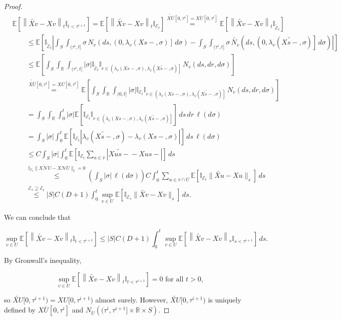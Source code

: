 \documentclass[12pt]{article}
\newcommand{\mb}{\mathbb}
\newcommand{\mc}{\mathcal}
\newcommand{\ov}{\overline}
\newcommand{\os}{\overset}
\newcommand{\te}{\text}
\newcommand{\ind}{\hspace{24pt}}
\newcommand{\ex}[1]{\mb{E}\left[#1\right]}			%
\renewcommand{\v}{v}							%
\newcommand{\vv}{u}								%
\renewcommand{\U}{U}							%
\renewcommand{\S}{S}							%
\newcommand{\s}{\sigma}							%
\renewcommand{\t}{t}							%
\renewcommand{\tt}{s}							%
\newcommand{\X}{X}								%
\newcommand{\neigh}{\mc{N}}						%
\newcommand{\cl}{\ov}							%
\newcommand{\const}{C}							%
\newcommand{\degr}{D}							%
\newcommand{\poiss}[1]{N_{#1}}						%
\renewcommand{\r}{r}								%
\newcommand{\rt}[1]{\tau^{#1}}						%
\newcommand{\itt}{i}								%
\newcommand{\rate}[1]{\lambda_{#1}}					%
\newcommand{\Sm}{\ell}								%
\newcommand{\alt}{\widetilde}						%
\newcommand{\evnt}{\mc{E}}						%
\begin{document}
\begin{proof}
\begin{align*}
&\ex{\left\|\alt{\X{\v}{}} - \X{\v}{}\right\|_{\t}\mb{I}_{\t < \rt{\itt+1}}} = \ex{\left\|\alt{\X{\v}{}} - \X{\v}{}\right\|_{\t}\mb{I}_{\evnt_\t}}\os{\alt{\X{\cl{\U}}{}}[0,\rt{\itt}] = \X{\cl{\U}}{[0,\rt{\itt}]}}{=} \ex{\left\|\alt{\X{\v}{}} - \X{\v}{}\right\|_{\t}\mb{I}_{\alt{\evnt}_\t}}\\
&\ind\leq \ex{\mb{I}_{\alt{\evnt}_\t}\left|\int_\S\int_{(\rt{\itt},t]} \s\,\poiss{\v}\left(d\tt,\left(0,\rate{\v}(\X{}{\tt-},\s)\right]\,d\s\right) - \int_\S\int_{(\rt{\itt},\t]} \s\,\alt{\poiss{\v}}\left(d\tt,\left(0,\rate{\v}(\alt{\X{}{\tt-}},\s)\right]\,d\s\right)\right|}\\
&\ind \leq \ex{\int_\S\int_{\mb{R}}\int_{(\rt{\itt},\t]}|\s|\mb{I}_{\alt{\evnt}_\t}\mb{I}_{\r\in \left(\rate{\v}(\X{}{\tt-},\s), \rate{\v}(\alt{\X{}{\tt-}},\s)\right]}\,\poiss{\v}\left(d\tt,d\r,d\s\right)}\\
&\ind \os{\alt{\X{\cl{\U}}{}}[0,\rt{\itt}] = \X{\cl{\U}}{[0,\rt{\itt}]}}{=} \ex{\int_\S\int_{\mb{R}}\int_{(0,\t]}|\s|\mb{I}_{\evnt_\t}\mb{I}_{\r\in \left(\rate{\v}(\X{}{\tt-},\s), \rate{\v}(\alt{\X{}{\tt-}},\s)\right]}\,\poiss{\v}\left(d\tt,d\r,d\s\right)}\\
&\ind = \int_\S\int_\mb{R}\int_0^\t |\s|\ex{\mb{I}_{\evnt_\t}\mb{I}_{\r\in\left(\rate{\v}(\X{}{\tt-},\s),\rate{\v}(\alt{\X{}{\tt-}},\s)\right]}}\,d\tt\,d\r\,\Sm(d\s)\\
&\ind = \int_\S |\s|\int_0^\t \ex{\mb{I}_{\evnt_t}\left|\rate{\v}(\alt{\X{}{\tt-}},\s) - \rate{\v}(\X{}{\tt-},\s)\right|}\,d\tt\,\Sm(d\s)\\
&\ind \leq \const{}\int_\S|\s|\int_0^\t\ex{\mb{I}_{\evnt_t}\sum_{\vv\in \cl{\v}}\left|\alt{\X{\vv}{\tt-}} - \X{\vv}{\tt-}\right|}\,d\tt\\
&\ind \os{\mb{I}_{\evnt_\t}\|\alt{\X{\neigh{\U}}{}} - \X{\neigh{\U}}{}\|_t = 0}{\leq} \left(\int_\S|\s|\,\Sm(d\s)\right)\const{} \int_0^\t \sum_{\vv\in \cl{\v}\cap\U}\ex{\mb{I}_{\evnt_t}\|\alt{\X{\vv}{}} - \X{\vv}{}\|_\tt}\,d\tt\\
&\ind \os{\evnt_\tt \supseteq \evnt_\t}{\leq} |S|\const{}(\degr+1) \int_0^\t \sup_{\v\in \U}\ex{\mb{I}_{\evnt_\tt}\|\alt{\X{\v}{}} - \X{\v}{}\|_\tt}\,d\tt.
\end{align*}

We can conclude that

\[\sup_{\v\in \U}\ex{\left\|\alt{\X{\v}{}} - \X{\v}{}\right\|_{\t}\mb{I}_{t <\rt{\itt+1}}} \leq |\S|\const{}(\degr+1)\int_0^\t\sup_{v\in\U}\ex{\left\|\alt{\X{\v}{}} - \X{\v}{}\right\|_\tt\mb{I}_{\tt < \rt{\itt+1}}}\,d\tt.\]

By Gronwall's inequality,

\[\sup_{v\in \U}\ex{\left\|\alt{\X{\v}{}} - \X{\v}{}\right\|_\t\mb{I}_{\t < \rt{\itt+1}}} = 0 \te{ for all } \t > 0,\]

so \(\alt{\X{\U}{}}[0,\rt{\itt+1}) = \X{\U}{[0,\rt{\itt+1})}\) almost surely. However, \(\alt{\X{\U}{}}[0,\rt{\itt+1})\) is uniquely defined by \(\X{\cl{\U}}{[0,\rt{\itt}]}\) and \(\poiss{\cl{\U}}\left((\rt{\itt},\rt{\itt+1}]\times \mb{R}\times \S\right)\).
\end{proof}
\end{document}
